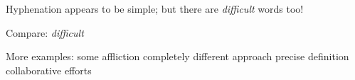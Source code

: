 \emergencystretch=16pt

Hyphenation appears to be simple; but there are {\it difficult} words too!

Compare: {\it di\hbox{f}\hbox{f}\hbox{i}cult}

More examples:
some affliction
completely different approach 
precise definition
collaborative efforts

\bye
